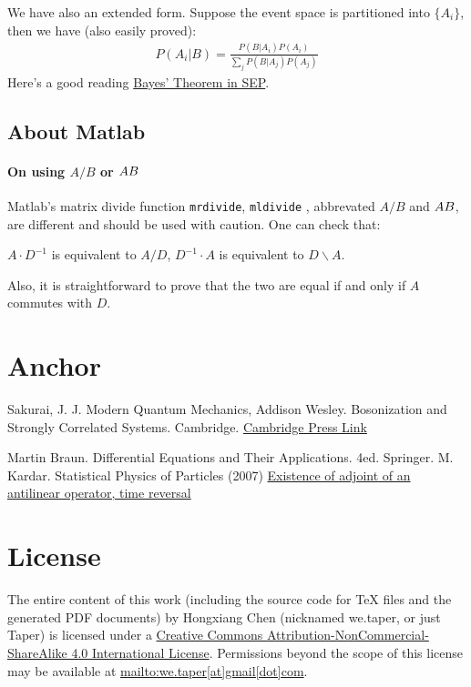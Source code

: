 \documentclass{article}
\numberwithin{equation}{subsection} %
\theoremstyle{definition}
\begin{document}
    We have also an extended form. Suppose the event space is partitioned
    into $\{A_i\}$, then we have (also easily proved):
    \begin{align}
        P(A_i|B)=\frac{P(B|A_i)P(A_i)}{\sum_j P(B|A_j)P(A_j)}
    \end{align}
    Here's a good reading \href{http://plato.stanford.edu/entries/bayes-theorem/}{Bayes' Theorem in SEP}.
    \subsection{About Matlab}
    \label{sec:About-Matlab}
    \paragraph{On using $A/B$ or $A\\B$}
    Matlab's matrix divide function \texttt{mrdivide}, \texttt{mldivide}
    , abbrevated $A/B$ and $A\\B$, are different and should be used with
    caution. One can check that:
    \begin{center}
        $A\cdot D^{-1}$ is equivalent to $A/D$, $D^{-1}\cdot A$ is
        equivalent to $D\backslash A$.
    \end{center}
    Also, it is straightforward to prove that the two are equal if and only if $A$ commutes with $D$.
\section{Anchor}
\begin{thebibliography}{1}
	 Sakurai, J. J. Modern Quantum Mechanics, Addison Wesley.
        Bosonization and Strongly Correlated Systems. Cambridge.
        \href{http://www.cambridge.org/us/academic/subjects/physics/condensed-matter-physics-nanoscience-and-mesoscopic-physics/bosonization-and-strongly-correlated-systems}{Cambridge Press Link}

     Martin Braun. Differential Equations and Their
    Applications. 4ed. Springer.
     M. Kardar. Statistical Physics of Particles (2007)
    \href{http://physics.stackexchange.com/questions/45227/existence-of-adjoint-of-an-antilinear-operator-time-reversal}{Existence of adjoint of an antilinear operator, time reversal}
\end{thebibliography}
\section{License}
The entire content of this work (including the source code
for TeX files and the generated PDF documents) by 
Hongxiang Chen (nicknamed we.taper, or just Taper) is
licensed under a 
\href{http://creativecommons.org/licenses/by-nc-sa/4.0/}{Creative 
Commons Attribution-NonCommercial-ShareAlike 4.0 International 
License}. Permissions beyond the scope of this 
license may be available at \url{mailto:we.taper[at]gmail[dot]com}.
\end{document}
